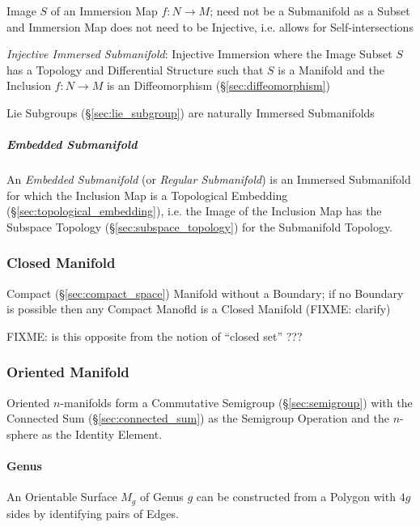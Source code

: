 Image $S$ of an Immersion Map $f : N \rightarrow M$; need not be a Submanifold
as a Subset and Immersion Map does not need to be Injective, i.e. allows for
Self-intersections

\emph{Injective Immersed Submanifold}: Injective Immersion where the Image
Subset $S$ has a Topology and Differential Structure such that $S$ is a
Manifold and the Inclusion $f : N \rightarrow M$ is an Diffeomorphism
(\S\ref{sec:diffeomorphism})

\fist Lie Subgroups (\S\ref{sec:lie_subgroup}) are naturally Immersed
Submanifolds



\subparagraph{Embedded Submanifold}\label{sec:embedded_submanifold}\hfill

An \emph{Embedded Submanifold} (or \emph{Regular Submanifold}) is an Immersed
Submanifold for which the Inclusion Map is a Topological Embedding
(\S\ref{sec:topological_embedding}), i.e. the Image of the Inclusion Map
has the Subspace Topology (\S\ref{sec:subspace_topology}) for the Submanifold
Topology.



\subsubsection{Closed Manifold}\label{sec:closed_manifold}

Compact (\S\ref{sec:compact_space}) Manifold without a Boundary; if no
Boundary is possible then any Compact Manofld is a Closed Manifold (FIXME:
clarify)

FIXME: is this opposite from the notion of ``closed set'' ???



\subsubsection{Oriented Manifold}\label{sec:oriented_manifold}

Oriented $n$-manifolds form a Commutative Semigroup
(\S\ref{sec:semigroup}) with the Connected Sum
(\S\ref{sec:connected_sum}) as the Semigroup Operation and the
$n$-sphere as the Identity Element.



\paragraph{Genus}\label{sec:genus}\hfill

An Orientable Surface $M_g$ of Genus $g$ can be constructed from a
Polygon with $4g$ sides by identifying pairs of Edges.



